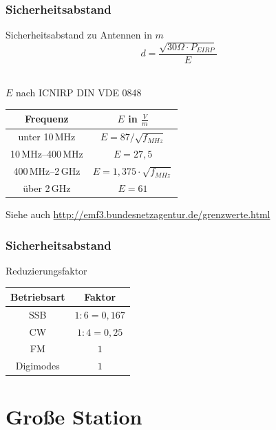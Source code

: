 \begin{frame}
  \frametitle{Sicherheitsabstand}
  \begin{center}
    \begin{block}{Sicherheitsabstand zu Antennen in $m$}
      $$d = \frac{\sqrt{30\Omega \cdot P_{EIRP}}}{E}$$ \\[3em]
      \begin{center}
        $E$ nach ICNIRP DIN VDE 0848 \\[1em]
        \begin{tabular}{c|c}
          Frequenz & $E$ in $\frac{V}{m}$ \\ \hline \hline
          unter 10\,MHz & $E = 87 / \sqrt{f_{MHz}}$ \\ \hline
          10\,MHz--400\,MHz & $E = 27,5$ \\ \hline
          400\,MHz--2\,GHz & $E = 1,375 \cdot \sqrt{f_{MHz}}$ \\ \hline
          über 2\,GHz & $E = 61$
        \end{tabular}
      \end{center}
    \end{block}
  \end{center}
  Siehe auch \url{http://emf3.bundesnetzagentur.de/grenzwerte.html}
\end{frame}

\begin{frame}
  \frametitle{Sicherheitsabstand}
  \begin{center}
    \begin{block}{Reduzierungsfaktor}
      \begin{center}
        \begin{tabular}{c|c}
          Betriebsart & Faktor \\ \hline \hline
          SSB & $1:6 = 0,167$ \\ \hline
          CW & $1:4 = 0,25$ \\ \hline
          FM & $1$ \\ \hline
          Digimodes & $1$
        \end{tabular}
      \end{center}
    \end{block}
  \end{center}
\end{frame}

\section*{Große Station}

